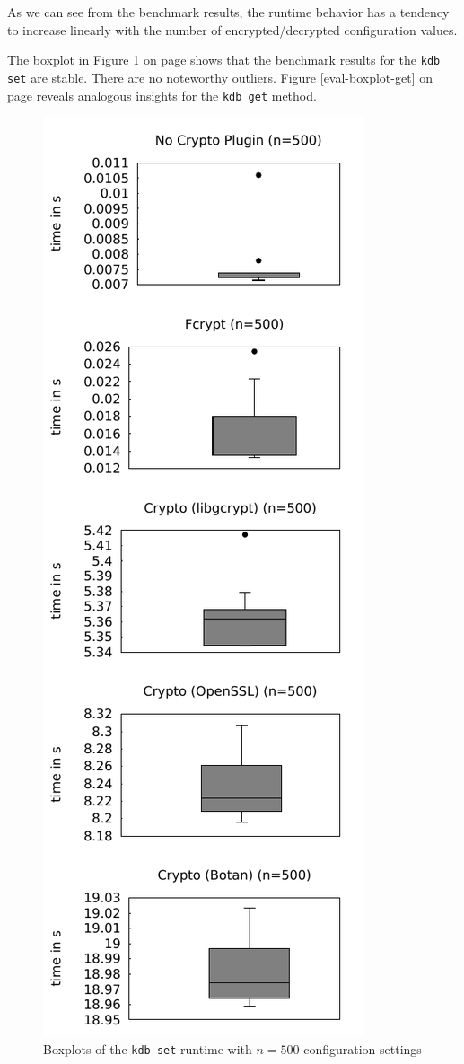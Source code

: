 As we can see from the benchmark results, the runtime behavior has a tendency to increase linearly with the number of encrypted/decrypted configuration values.

The boxplot in Figure \ref{eval-boxplot-set} on page \pageref{eval-boxplot-set} shows that the benchmark results for the \texttt{kdb set} are stable.
There are no noteworthy outliers.
Figure \ref{eval-boxplot-get} on page \pageref{eval-boxplot-get} reveals analogous insights for the \texttt{kdb get} method.

\begin{figure}[h]
\center
\caption{Boxplots of the \texttt{kdb set} runtime with $n = 500$ configuration settings}
\label{eval-boxplot-set}
\includegraphics{plots/boxplot_500_set.pdf}
\end{figure}

